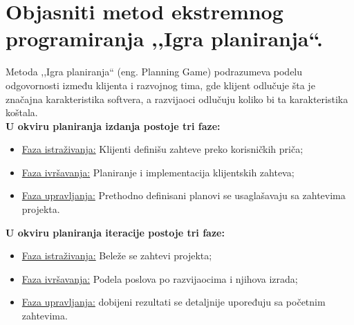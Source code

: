 \documentclass[a4paper]{article}
\begin{document}
\section{Objasniti metod ekstremnog programiranja ,,Igra planiranja``.}
  Metoda ,,Igra planiranja`` (eng. Planning Game) podrazumeva podelu odgovornosti između klijenta
  i razvojnog tima, gde klijent odlučuje šta je značajna karakteristika softvera, a razvijaoci
  odlučuju koliko bi ta karakteristika koštala. \\
  \textbf{U okviru planiranja izdanja postoje tri faze:}
  \begin{itemize}
    \item \underline{Faza istraživanja:} Klijenti definišu zahteve preko korisničkih priča;
    \item \underline{Faza ivršavanja:} Planiranje i implementacija klijentskih zahteva;
    \item \underline{Faza upravljanja:} Prethodno definisani planovi se usaglašavaju sa zahtevima projekta.
  \end{itemize}
  \textbf{U okviru planiranja iteracije postoje tri faze:}
  \begin{itemize}
    \item \underline{Faza istraživanja:} Beleže se zahtevi projekta;
    \item \underline{Faza ivršavanja:} Podela poslova po razvijaocima i njihova izrada;
    \item \underline{Faza upravljanja:} dobijeni rezultati se detaljnije upoređuju sa početnim zahtevima.
  \end{itemize}
\end{document}
